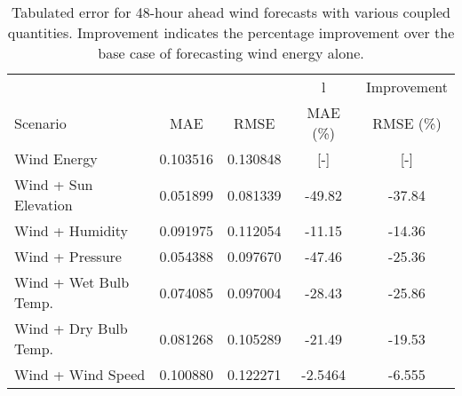   \begin{table*}[b]
    \centering
    \caption{Tabulated error for 48-hour ahead wind forecasts with various coupled quantities. Improvement indicates the percentage improvement over the base case of forecasting wind energy alone.}
    \label{tab:wind48}
    \begin{tabular}{l|c|c|c|c}
      &  & & l & Improvement \\
      Scenario  & MAE & RMSE & MAE (\%) & RMSE (\%)\\
      \hline
      Wind Energy & 0.103516 & 0.130848 & [-] & [-] \\
      Wind + Sun Elevation & 0.051899 & 0.081339 & -49.82 & -37.84\\
      Wind + Humidity & 0.091975 & 0.112054 & -11.15 & -14.36\\
      Wind + Pressure & 0.054388 & 0.097670 & -47.46 & -25.36\\
      Wind + Wet Bulb Temp. & 0.074085 & 0.097004 & -28.43 & -25.86\\
      Wind + Dry Bulb Temp. & 0.081268 & 0.105289 & -21.49 & -19.53\\
      Wind + Wind Speed & 0.100880 & 0.122271 & -2.5464 &-6.555 \\
    \end{tabular}
  \end{table*}
